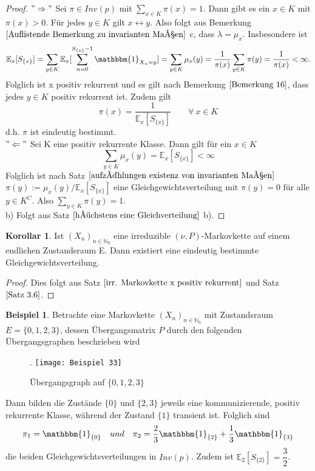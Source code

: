 \documentclass[a4paper,12pt]{scrartcl}
\theoremstyle{definition}
\newtheorem{kol}{Korollar}[section]
\newtheorem{bsp}{Beispiel}[section]
\begin{document}
\begin{proof}
$"\Rightarrow"$ Sei $\pi \in Inv(p)$ mit $\sum_{x \in K} \pi(x) = 1$. Dann gibt es ein $x \in K$ mit $\pi(x) > 0$. Für jedes $y \in K$ gilt $x \leftrightarrow y$. Also folgt aus Bemerkung $\ref{Auflistende Bemerkung zu invarianten Maßen}$ c, dass $\lambda = \mu_{x}$. Insbesondere ist
\begin{equation*}
\mathbb{E}_{x}[S_{\lbrace x \rbrace}] = \sum_{y \in K} \mathbb{E}_{x}[\sum_{n=0}^{S_{\lbrace x \rbrace}-1} \mathbbm{1}_{X_{n}=y}] = \sum_{y \in K} \mu_{x}(y) = \dfrac{1}{\pi(x)} \sum_{y \in K} \pi(y) = \dfrac{1}{\pi(x)} < \infty.
\end{equation*}
Folglich ist x positiv rekurrent und es gilt nach Bemerkung $\ref{Bemerkung 16}$, dass jedes $y \in K$ positiv rekurrent ist. Zudem gilt
\begin{equation*}
\pi(x) = \dfrac{1}{\mathbb{E}_{x}[S_{\lbrace x \rbrace}]} \qquad \forall  \: x \in K
\end{equation*}
d.h. $\pi$ ist eindeutig bestimmt.
\\
$"\Leftarrow"$ Sei K eine positiv rekurrente Klasse. Dann gilt für ein $x \in K$
\begin{equation*}
\sum_{y \in K} \mu_{x}(y) = \mathbb{E}_{x}[S_{\lbrace x \rbrace}]  < \infty
\end{equation*}
Folglich ist nach Satz $\ref{aufzählungen existenz von invarianten Maßen}$ $\pi(y) := \mu_{x}(y) / \mathbb{E}_{x}[S_{\lbrace x \rbrace}]$ eine Gleichgewichtsverteilung mit $\pi(y) = 0$ für alle $y \in K^{C}$. Also $\sum_{y \in K} \pi(y) = 1$.
\\
b) Folgt aus Satz $\ref{höchstens eine Gleichverteilung}$ b).
\end{proof}
\begin{kol}
Ist $(X_{n})_{n \in \mathbb{N}_{0}}$ eine irreduzible $(\nu,P)$-Markovkette auf einem endlichen Zustandsraum E. Dann existiert eine eindeutig bestimmte Gleichgewichtsverteilung.
\end{kol}
\begin{proof}
Dies folgt aus Satz $\ref{irr. Markovkette x positiv rekurrent}$ und Satz $\ref{Satz 3.6}$.
\end{proof}
\begin{bsp}
Betrachte eine Markovkette $(X_{n})_{n \in \mathbb{N}_{0}}$ mit Zustandsraum $E = \lbrace 0,1,2,3 \rbrace$, dessen Übergangsmatrix $P$ durch den folgenden Übergangsgraphen beschrieben wird
\begin{figure}[H].
\centering
\texttt{[image: Beispiel 33]}
\caption{Übergangsgraph auf $\lbrace 0,1,2,3 \rbrace$}
\end{figure}
\noindent
Dann bilden die Zustände $\lbrace 0 \rbrace$ und $\lbrace 2,3 \rbrace$ jeweils eine kommunizierende, positiv rekurrente Klasse, während der Zustand $\lbrace 1 \rbrace$ transient ist. Folglich sind
\begin{equation*}
\pi_{1} = \mathbbm{1}_{\lbrace 0 \rbrace} \quad und \quad \pi_{2} = \dfrac{2}{3}\mathbbm{1}_{\lbrace 2 \rbrace} + \dfrac{1}{3}\mathbbm{1}_{\lbrace 3 \rbrace}
\end{equation*}
die beiden Gleichgewichtsverteilungen in $Inv(p)$. Zudem ist $\mathbb{E}_{2}[S_{\lbrace 2 \rbrace}] = \dfrac{3}{2}$.
\end{bsp}
\end{document}

